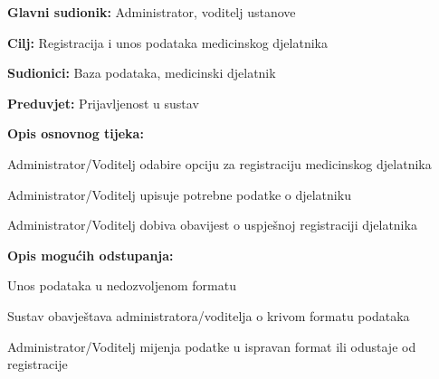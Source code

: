 					\noindent {}
				\begin{packed_item}
					
					\item \textbf{Glavni sudionik: }Administrator, voditelj ustanove
					\item  \textbf{Cilj:} Registracija i unos podataka medicinskog djelatnika
					\item  \textbf{Sudionici:} Baza podataka, medicinski djelatnik
					\item  \textbf{Preduvjet:} Prijavljenost u sustav
					\item  \textbf{Opis osnovnog tijeka:}
					
		
					\item[] \begin{packed_enum}
						
						\item Administrator/Voditelj odabire opciju za registraciju medicinskog djelatnika
						\item Administrator/Voditelj upisuje potrebne podatke o djelatniku
						\item Administrator/Voditelj dobiva obavijest o uspješnoj registraciji djelatnika
						
					\end{packed_enum}
					
					\item  \textbf{Opis mogućih odstupanja:}
				\item[] \begin{packed_item}
					
					\item[2.a] Unos podataka u nedozvoljenom formatu
					\item[] \begin{packed_enum}
						
						\item Sustav obavještava administratora/voditelja o krivom formatu podataka
						\item Administrator/Voditelj mijenja podatke u ispravan format ili odustaje od registracije
						
					\end{packed_enum}
				
					
				\end{packed_item}							
				\end{packed_item}
			
